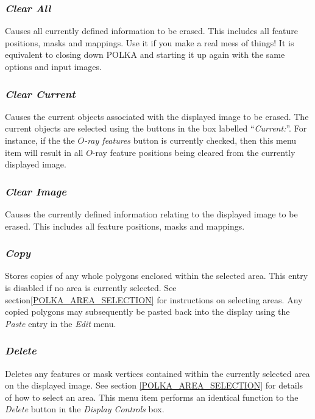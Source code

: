 \documentclass[11pt]{article}
\newcommand{\hyperref}[4]{#2\ref{#4}#3}
\newcommand{\htmlref}[2]{#1}
\newcommand{\xlabel}[1]{}
\newcommand{\mylabel}[1] {\xlabel{#1}\label{#1}}
\begin{document}
\subsubsection {\mylabel{POLKA_CLEAR_ALL}\emph{Clear All}} Causes all currently defined information to be
erased. This includes all feature positions, masks and mappings. Use it
if you make a real mess of things! It is equivalent to closing down POLKA
and starting it up again with the same options and input images.

\subsubsection {\mylabel{POLKA_CLEAR_CURRENT}\emph{Clear Current}} Causes the
current objects associated with the displayed image to be erased. The
current objects are selected using the buttons in the box labelled
``\htmlref{\emph{Current:}}{POLKA_CURRENT}''. For instance, if the the
\emph{$O$-ray features} button is currently checked, then this menu item
will result in all $O$-ray feature positions being cleared from the
currently displayed image.

\subsubsection {\mylabel{POLKA_CLEAR_IMAGE}\emph{Clear Image}} Causes the
currently defined information relating to the displayed image to be
erased. This includes all feature positions, masks and mappings.

\subsubsection {\mylabel{POLKA_COPY}\emph{Copy}} Stores copies of any
whole polygons enclosed within the selected area. This entry is disabled
if no area is currently selected. \hyperref{Go here}{See
section}{}{POLKA_AREA_SELECTION} for instructions on selecting areas. Any
copied polygons may subsequently be pasted back into the display using
the \htmlref{\emph{Paste}}{POLKA_PASTE} entry in the \emph{Edit} menu.

\subsubsection {\mylabel{POLKA_DELETE_FEATURES}\emph{Delete}} Deletes any features
or mask vertices contained within the currently selected area on the
displayed image. See \hyperref{here}{section }{}{POLKA_AREA_SELECTION}
for details of how to select an area. This menu item performs an
identical function to the \htmlref{\emph{Delete}}{POLKA_DELETE} button in
the \htmlref{\emph{Display Controls}}{ POLKA_DISPLAY_CONTROLS} box.
\end{document}
